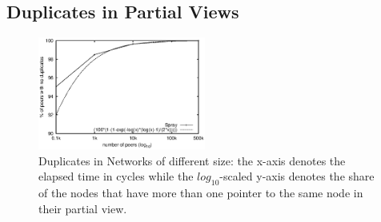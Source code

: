 
\subsection{Duplicates in Partial Views}

\begin{figure}
  \centering
  \includegraphics[width=0.49\textwidth]{img/dupl.eps}
  \caption{\label{fig:dupl} Duplicates in Networks of different size: the
    x-axis denotes the elapsed time in cycles while the $log_{10}$-scaled
    y-axis denotes the share of the nodes that have more than one pointer to
    the same node in their partial view.}
\end{figure}

